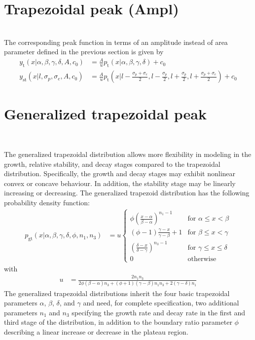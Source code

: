 \section{Trapezoidal peak (Ampl)} ~\\
\label{sec:trapezoidalAmpl}
The corresponding peak function in terms of an amplitude instead of area parameter defined in the previous section is given by
\begin{align}\label{eq:trapezoidalpeakAmpl}
y_\mathrm{t}(x|\alpha,\beta,\gamma,\delta,A,c_0) &= \frac{A}{u}\textstyle p_\mathrm{t}(x|\alpha,\beta,\gamma,\delta) +c_0 \\
y_\mathrm{st}(x|l,\sigma_p,\sigma_e,A,c_0) &= \frac{A}{u} \textstyle p_\mathrm{t}\left(x|l-\frac{\sigma_p+\sigma_e}{2},l-\frac{\sigma_p}{2},l+\frac{\sigma_p}{2},l+\frac{\sigma_p+\sigma_e}{2}\right) +c_0
\end{align}
\clearpage
\section{Generalized trapezoidal peak} ~\\
\label{sec:generalizedtrapezoidal}

 The generalized trapezoidal distribution allows more flexibility in modeling in the growth, relative stability, and decay stages compared to the trapezoidal distribution. Specifically, the growth and decay stages may exhibit nonlinear convex or concave behaviour. In addition, the stability stage may be linearly increasing or decreasing. The generalized trapezoid distribution \cite{Dorp2003} has the following probability density function:
\begin{align}
p_\mathrm{gt}(x|\alpha,\beta,\gamma,\delta,\phi,n_1,n_3) &=
 u
 \begin{cases}
 \phi \left(\frac{x-\alpha}{\beta-\alpha}\right)^{n_1-1}  &{\text{for }}\alpha\leq x<\beta\\
 \left(\phi-1\right)\frac{\gamma-x}{\gamma-\beta}+1  &{\text{for }}\beta\leq x<\gamma \\
 \left(\frac{\delta-x}{\delta-\gamma}\right)^{n_3-1}  &{\text{for }}\gamma\leq x\leq \delta \\
 {0} &{\text{otherwise }}
\end{cases}
\end{align}
with
\begin{align}
u &= \frac{2 n_1 n_3}{2 \phi (\beta-\alpha) n_3+(\phi+1)(\gamma-\beta)  n_1 n_3+2(\gamma-\delta) n_1}
\end{align}
The generalized trapezoidal distributions inherit the four basic trapezoidal parameters $\alpha$, $\beta$, $\delta$, and $\gamma$ and need, for complete specification, two additional parameters $n_1$ and $n_3$ specifying the
growth rate and decay rate in the first and third stage of the distribution, in
addition to the boundary ratio parameter $\phi$ describing a linear increase or decrease in the plateau region.

